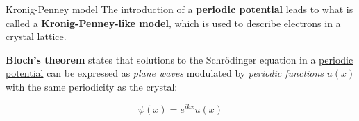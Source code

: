 \begin{frame}{Kronig-Penney model}
    The introduction of a \textbf{periodic potential} leads to what is called a \textcolor{BrickRed}{\textbf{Kronig-Penney-like model}}, which is used to describe electrons in a \underline{crystal lattice}.

    \pause

    \begin{center}
      \begin{framed}
        \textcolor{BrickRed}{\textbf{Bloch's theorem}} states that solutions to the Schrödinger equation in a \underline{periodic potential} can be expressed as \textit{plane waves} modulated by \textit{periodic functions} $u(x)$ with the same periodicity as the crystal:

        \begin{equation*}
            \psi(x)=e^{ikx}u(x)
        \end{equation*}
      \end{framed}
   \end{center}
\end{frame}

